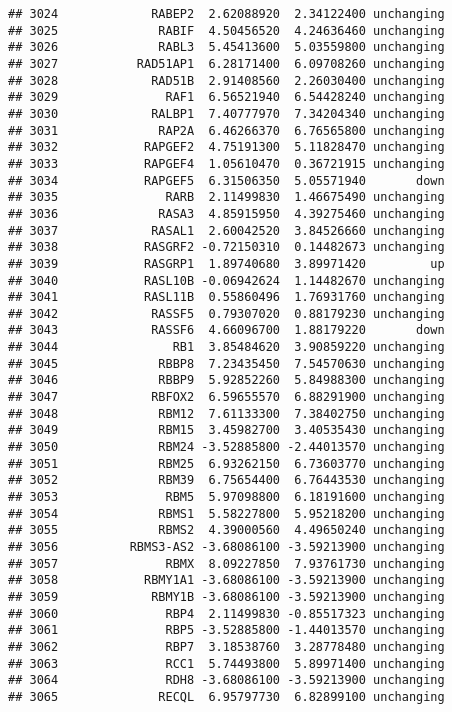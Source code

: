 \documentclass[]{article}
\begin{document}
\begin{verbatim}
## 3024             RABEP2  2.62088920  2.34122400 unchanging
## 3025              RABIF  4.50456520  4.24636460 unchanging
## 3026              RABL3  5.45413600  5.03559800 unchanging
## 3027           RAD51AP1  6.28171400  6.09708260 unchanging
## 3028             RAD51B  2.91408560  2.26030400 unchanging
## 3029               RAF1  6.56521940  6.54428240 unchanging
## 3030             RALBP1  7.40777970  7.34204340 unchanging
## 3031              RAP2A  6.46266370  6.76565800 unchanging
## 3032            RAPGEF2  4.75191300  5.11828470 unchanging
## 3033            RAPGEF4  1.05610470  0.36721915 unchanging
## 3034            RAPGEF5  6.31506350  5.05571940       down
## 3035               RARB  2.11499830  1.46675490 unchanging
## 3036              RASA3  4.85915950  4.39275460 unchanging
## 3037             RASAL1  2.60042520  3.84526660 unchanging
## 3038            RASGRF2 -0.72150310  0.14482673 unchanging
## 3039            RASGRP1  1.89740680  3.89971420         up
## 3040            RASL10B -0.06942624  1.14482670 unchanging
## 3041            RASL11B  0.55860496  1.76931760 unchanging
## 3042             RASSF5  0.79307020  0.88179230 unchanging
## 3043             RASSF6  4.66096700  1.88179220       down
## 3044                RB1  3.85484620  3.90859220 unchanging
## 3045              RBBP8  7.23435450  7.54570630 unchanging
## 3046              RBBP9  5.92852260  5.84988300 unchanging
## 3047             RBFOX2  6.59655570  6.88291900 unchanging
## 3048              RBM12  7.61133300  7.38402750 unchanging
## 3049              RBM15  3.45982700  3.40535430 unchanging
## 3050              RBM24 -3.52885800 -2.44013570 unchanging
## 3051              RBM25  6.93262150  6.73603770 unchanging
## 3052              RBM39  6.75654400  6.76443530 unchanging
## 3053               RBM5  5.97098800  6.18191600 unchanging
## 3054              RBMS1  5.58227800  5.95218200 unchanging
## 3055              RBMS2  4.39000560  4.49650240 unchanging
## 3056          RBMS3-AS2 -3.68086100 -3.59213900 unchanging
## 3057               RBMX  8.09227850  7.93761730 unchanging
## 3058            RBMY1A1 -3.68086100 -3.59213900 unchanging
## 3059             RBMY1B -3.68086100 -3.59213900 unchanging
## 3060               RBP4  2.11499830 -0.85517323 unchanging
## 3061               RBP5 -3.52885800 -1.44013570 unchanging
## 3062               RBP7  3.18538760  3.28778480 unchanging
## 3063               RCC1  5.74493800  5.89971400 unchanging
## 3064               RDH8 -3.68086100 -3.59213900 unchanging
## 3065              RECQL  6.95797730  6.82899100 unchanging

\end{verbatim}
\end{document}
